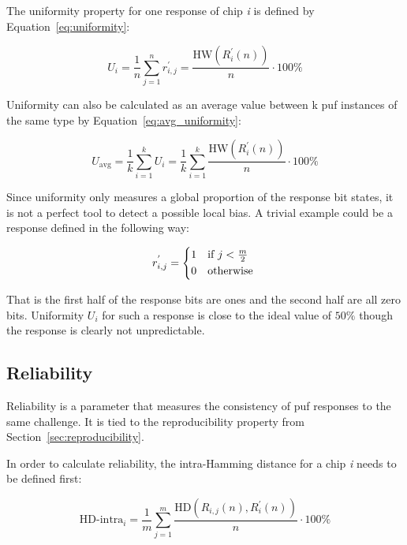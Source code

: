 The uniformity property for one response of chip \emph{i} is defined by Equation~\ref{eq:uniformity}:

\begin{equation}\label{eq:uniformity}
    U_{i} = \frac{1}{n}\sum_{j=1}^{n}r_{i,j}^{'} = \frac{\textrm{HW}(R_{i}^{'}(n))}{n} \cdot 100\% 
\end{equation}

Uniformity can also be calculated as an average value between k \gls{puf} instances of the same type by Equation~\ref{eq:avg_uniformity}\cite{Maiti2011}:

\begin{equation}\label{eq:avg_uniformity}
    U_{\textrm{avg}} = \frac{1}{k}\sum_{i=1}^{k}U_{i} = \frac{1}{k}\sum_{i=1}^{k}\frac{\textrm{HW}(R_{i}^{'}(n))}{n} \cdot 100\%
\end{equation}

Since uniformity only measures a global proportion of the response bit states, it is not a perfect tool to detect a possible local bias. A trivial example could be a response defined in the following way:

\begin{equation}
    r_{i, j}^{'} =
    \begin{cases*}
        1 & if $j < \frac{m}{2}$ \\
        0 & otherwise
    \end{cases*}
\end{equation}

That is the first half of the response bits are ones and the second half are all zero bits. Uniformity $U_{i}$ for such a response is close to the ideal value of $50\%$ though the response is clearly not unpredictable.

\subsection{Reliability}\label{sec:reliability}

Reliability is a parameter that measures the consistency of \gls{puf} responses to the same challenge. It is tied to the reproducibility property from Section~\ref{sec:reproducibility}.

In order to calculate reliability, the intra-Hamming distance for a chip \emph{i} needs to be defined first\cite{Maiti2011}: 

\begin{equation}\label{eq:hd_intra}
    \textrm{HD-intra}_{i} = \frac{1}{m} \sum_{j=1}^{m}\frac{\textrm{HD}(R_{i,j}(n), R_{i}^{'}(n))}{n} \cdot 100 \%
\end{equation}

